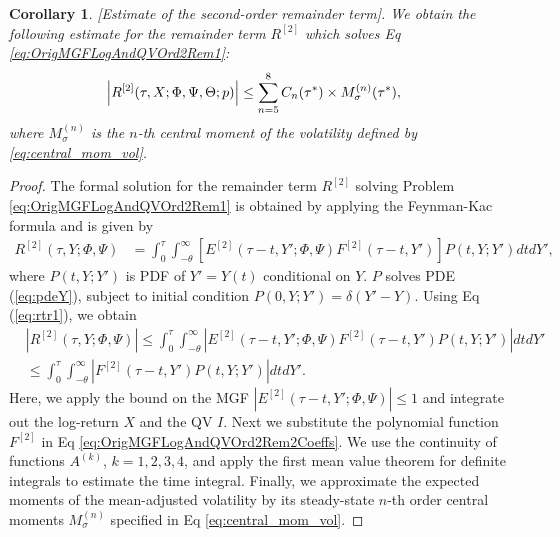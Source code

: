 \documentclass[pdftex,11pt,a4paper] {article}
\newtheorem{corollary}{Corollary}[section]
\begin{document}
\begin{corollary} \label{pr:ar2}[Estimate of the second-order remainder term]. We obtain the following estimate for the remainder term $R^{[2]}$ which solves Eq \eqref{eq:OrigMGFLogAndQVOrd2Rem1}: 
\begin{equation} \label{eq:rem2}
\begin{split}
\left| R^{[2]}(\tau,X; \Phi,\Psi,\Theta;p) \right|  & \leq  \sum^{8}_{n=5}C_{n}(\tau^{*})\times M^{(n)}_{\sigma}(\tau^{*}),\vspace*{-1.0\baselineskip} 
\end{split}
\end{equation}
where $M^{(n)}_{\sigma}$ is the $n$-th central moment of the volatility defined by \eqref{eq:central_mom_vol}.
\end{corollary}


\begin{proof}
The formal solution for the remainder term $R^{[2]}$ solving Problem \eqref{eq:OrigMGFLogAndQVOrd2Rem1} is obtained by applying the Feynman-Kac formula and is given by
\begin{equation} \label {eq:rtr1}
\begin{split}
R^{[2]}(\tau,Y; \Phi,\Psi)&  = \int^{\tau}_{0}\int^{\infty}_{-\theta}\left[ E^{[2]}(\tau-t,Y'; \Phi,\Psi) F^{[2]}(\tau-t,Y') \right]P(t,Y;Y')dtdY',
\end{split}
\end{equation}
where $P(t,Y;Y')$ is PDF of $Y'=Y(t)$ conditional on $Y$. $P$ solves PDE (\ref{eq:pdeY}), subject to initial condition $P(0,Y;Y')=\delta(Y'-Y)$. Using Eq (\ref{eq:rtr1}), we obtain
\begin{equation} \label {eq:rt22}
\begin{split}
&\left| R^{[2]}(\tau,Y; \Phi,\Psi) \right|   \leq  \int^{\tau}_{0}\int^{\infty}_{-\theta} \left|E^{[2]}(\tau-t,Y'; \Phi,\Psi)F^{[2]}(\tau-t,Y') P(t,Y;Y')  \right|dtdY'\\
& \leq \int^{\tau}_{0}\int^{\infty}_{-\theta} \left| F^{[2]}(\tau-t,Y') P(t,Y;Y')  \right|dtdY'.\end{split}
\end{equation}
Here, we apply the bound on the MGF $\left|E^{[2]}(\tau-t,Y'; \Phi,\Psi) \right|\leq 1$ and integrate out the log-return $X$ and the QV $I$. 
Next we substitute the polynomial function $F^{[2]}$ in Eq \eqref{eq:OrigMGFLogAndQVOrd2Rem2Coeffs}. We use the continuity of functions $A^{(k)}$, $k=1,2,3,4$, and apply the first mean value theorem for definite integrals to estimate the time integral. Finally, we approximate the expected moments of the mean-adjusted volatility by its steady-state $n$-th order central moments $M^{(n)}_{\sigma}$ specified in Eq \eqref{eq:central_mom_vol}.

\end{proof}
\end{document}
